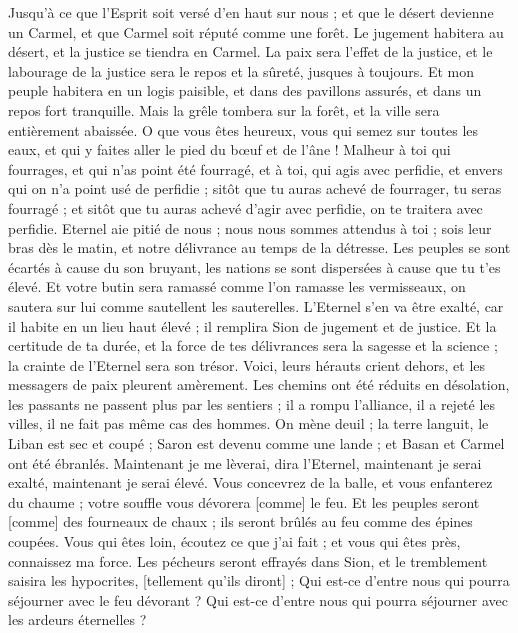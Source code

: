 \begin{multicols}{2}
Jusqu'à ce que l'Esprit soit versé d'en haut sur nous ; et que le désert devienne un Carmel, et que Carmel soit réputé comme une forêt.
Le jugement habitera au désert, et la justice se tiendra en Carmel.
La paix sera l'effet de la justice, et le labourage de la justice sera le repos et la sûreté, jusques à toujours.
Et mon peuple habitera en un logis paisible, et dans des pavillons assurés, et dans un repos fort tranquille.
Mais la grêle tombera sur la forêt, et la ville sera entièrement abaissée.
O que vous êtes heureux, vous qui semez sur toutes les eaux, et qui y faites aller le pied du bœuf et de l'âne !
\VerseOne{}Malheur à toi qui fourrages, et qui n'as point été fourragé, et à toi, qui agis avec perfidie, et envers qui on n'a point usé de perfidie ; sitôt que tu auras achevé de fourrager, tu seras fourragé ; et sitôt que tu auras achevé d'agir avec perfidie, on te traitera avec perfidie.
Eternel aie pitié de nous ; nous nous sommes attendus à toi ; sois leur bras dès le matin, et notre délivrance au temps de la détresse.
Les peuples se sont écartés à cause du son bruyant, les nations se sont dispersées à cause que tu t'es élevé.
Et votre butin sera ramassé comme l'on ramasse les vermisseaux, on sautera sur lui comme sautellent les sauterelles.
L'Eternel s'en va être exalté, car il habite en un lieu haut élevé ; il remplira Sion de jugement et de justice.
Et la certitude de ta durée, et la force de tes délivrances sera la sagesse et la science ; la crainte de l'Eternel sera son trésor.
Voici, leurs hérauts crient dehors, et les messagers de paix pleurent amèrement.
Les chemins ont été réduits en désolation, les passants ne passent plus par les sentiers ; il a rompu l'alliance, il a rejeté les villes, il ne fait pas même cas des hommes.
On mène deuil ; la terre languit, le Liban est sec et coupé ; Saron est devenu comme une lande ; et Basan et Carmel ont été ébranlés.
Maintenant je me lèverai, dira l'Eternel, maintenant je serai exalté, maintenant je serai élevé.
Vous concevrez de la balle, et vous enfanterez du chaume ; votre souffle vous dévorera [comme] le feu.
Et les peuples seront [comme] des fourneaux de chaux ; ils seront brûlés au feu comme des épines coupées.
Vous qui êtes loin, écoutez ce que j'ai fait ; et vous qui êtes près, connaissez ma force.
Les pécheurs seront effrayés dans Sion, et le tremblement saisira les hypocrites, [tellement qu'ils diront] ; Qui est-ce d'entre nous qui pourra séjourner avec le feu dévorant ? Qui est-ce d'entre nous qui pourra séjourner avec les ardeurs éternelles ?

\end{multicols}
